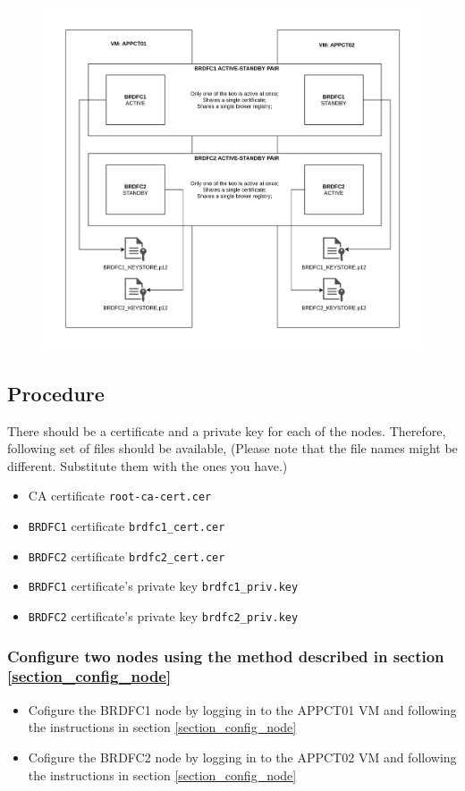 \documentclass{article}
\begin{document}
    \begin{figure}[h]
        \centering
        \includegraphics[width=\textwidth,height=\textheight,keepaspectratio]{ha-setup.png}
    \end{figure}
    \FloatBarrier

    \subsection{Procedure}
    There should be a certificate and a private key for each of the nodes. Therefore, following set of files should be available, (Please note that the file names might be different. Substitute them with the ones you have.)
    
    \begin{itemize}
        \item CA certificate \texttt{root-ca-cert.cer}
        \item \texttt{BRDFC1} certificate \texttt{brdfc1\_cert.cer}
        \item \texttt{BRDFC2} certificate \texttt{brdfc2\_cert.cer}
        \item \texttt{BRDFC1} certificate's private key \texttt{brdfc1\_priv.key}
        \item \texttt{BRDFC2} certificate's private key \texttt{brdfc2\_priv.key}
    \end{itemize}


    \subsubsection{Configure two nodes using the method described in section \ref{section_config_node}} 
    \begin{itemize}
        \item Cofigure the BRDFC1 node by logging in to the APPCT01 VM and following the instructions in section \ref{section_config_node}
        \item Cofigure the BRDFC2 node by logging in to the APPCT02 VM and following the instructions in section \ref{section_config_node}
    \end{itemize}
\end{document}
